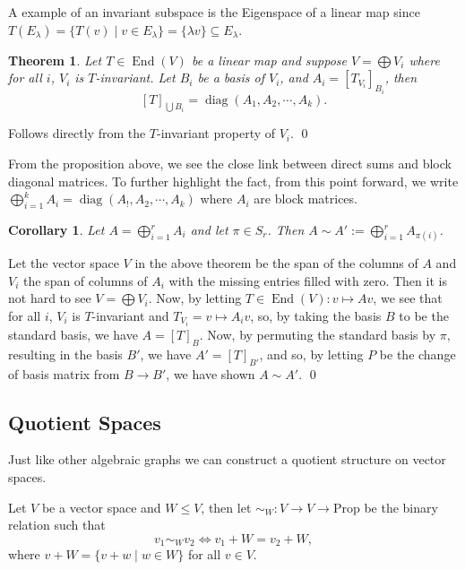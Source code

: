 \documentclass[
]{article}
\newtheorem{theorem}{Theorem}
\newtheorem{corollary}{Corollary}[theorem]
\theoremstyle{definition}
\begin{document}
A example of an invariant subspace is the Eigenspace of a linear map
since
\(T(E_\lambda) = \{ T(v) \mid v \in E_\lambda \} = \{\lambda v \} \subseteq E_\lambda\).

\begin{theorem}
  Let \(T \in \mathop{\mathrm{End}}(V)\) be a linear map and suppose \(V = \bigoplus V_i\) where 
  for all \(i\), \(V_i\) is \(T\)-invariant. Let \(B_i\) be a basis of \(V_i\),
  and \(A_i = [T_{V_i}]_{B_i}\), then 
  \[[T]_{\bigcup B_i} = \mathop{\mathrm{diag}}(A_1, A_2, \cdots, A_k).\] 
\end{theorem}
\proof

Follows directly from the \(T\)-invariant property of \(V_i\). \qed

From the proposition above, we see the close link between direct sums
and block diagonal matrices. To further highlight the fact, from this
point forward, we write
\(\bigoplus_{i = 1}^k A_i = \mathop{\mathrm{diag}}(A_!, A_2, \cdots, A_k)\)
where \(A_i\) are block matrices.

\begin{corollary}
  Let \(A = \bigoplus_{i = 1}^r A_i\) and let \(\pi \in S_r\). Then 
  \(A \sim A' := \bigoplus_{i = 1}^r A_{\pi(i)}\).
\end{corollary}
\proof

Let the vector space \(V\) in the above theorem be the span of the
columns of \(A\) and \(V_i\) the span of columns of \(A_i\) with the
missing entries filled with zero. Then it is not hard to see
\(V = \bigoplus V_i\). Now, by letting
\(T \in \mathop{\mathrm{End}}(V) : v \mapsto A v\), we see that for all
\(i\), \(V_i\) is \(T\)-invariant and \(T_{V_i} = v \mapsto A_i v\), so,
by taking the basis \(B\) to be the standard basis, we have
\(A = [T]_B\). Now, by permuting the standard basis by \(\pi\),
resulting in the basis \(B'\), we have \(A' = [T]_{B'}\), and so, by
letting \(P\) be the change of basis matrix from \(B \to B'\), we have
shown \(A \sim A'\). \qed

\hypertarget{quotient-spaces}{%
\subsection{Quotient Spaces}\label{quotient-spaces}}

Just like other algebraic graphs we can construct a quotient structure
on vector spaces.

Let \(V\) be a vector space and \(W \le V\), then let
\(\sim_W : V \to V \to \text{Prop}\) be the binary relation such that
\[v_1 \sim_W v_2 \iff v_1 + W = v_2 + W,\] where
\(v + W = \{v + w \mid w \in W\}\) for all \(v \in V\).
\end{document}
